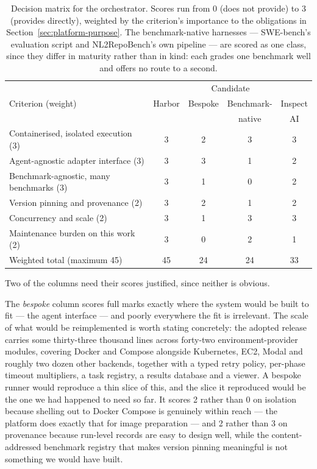 \begin{table}[htbp]
\centering
\caption{Decision matrix for the orchestrator. Scores run from 0 (does not
provide) to 3 (provides directly), weighted by the criterion's importance to
the obligations in Section~\ref{sec:platform-purpose}. The benchmark-native
harnesses --- SWE-bench's evaluation script and NL2RepoBench's own pipeline ---
are scored as one class, since they differ in maturity rather than in kind:
each grades one benchmark well and offers no route to a second.}
\label{tab:orchestrator-matrix}
\begin{tabular}{lcccc}
\toprule
                                        & \multicolumn{4}{c}{Candidate} \\
Criterion (weight)                      & Harbor & Bespoke & Benchmark- & Inspect \\
                                        &        &         & native     & AI      \\
\midrule
Containerised, isolated execution (3)   & 3  & 2  & 3  & 3  \\
Agent-agnostic adapter interface (3)    & 3  & 3  & 1  & 2  \\
Benchmark-agnostic, many benchmarks (3) & 3  & 1  & 0  & 2  \\
Version pinning and provenance (2)      & 3  & 2  & 1  & 2  \\
Concurrency and scale (2)               & 3  & 1  & 3  & 3  \\
Maintenance burden on this work (2)     & 3  & 0  & 2  & 1  \\
\midrule
Weighted total (maximum 45)             & 45 & 24 & 24 & 33 \\
\bottomrule
\end{tabular}
\end{table}

Two of the columns need their scores justified, since neither is obvious.

The \emph{bespoke} column scores full marks exactly where the system would be
built to fit --- the agent interface --- and poorly everywhere the fit is
irrelevant. The scale of what would be reimplemented is worth stating
concretely: the adopted release carries some thirty-three thousand lines across
forty-two environment-provider modules, covering Docker and Compose alongside
Kubernetes, EC2, Modal and roughly two dozen other backends, together with a
typed retry policy, per-phase timeout multipliers, a task registry, a results
database and a viewer. A bespoke runner would reproduce a thin slice of this,
and the slice it reproduced would be the one we had happened to need so far. It
scores 2 rather than 0 on isolation because shelling out to Docker Compose is
genuinely within reach --- the platform does exactly that for image
preparation --- and 2 rather than 3 on provenance because run-level records are
easy to design well, while the content-addressed benchmark registry that makes
version pinning meaningful is not something we would have built.

